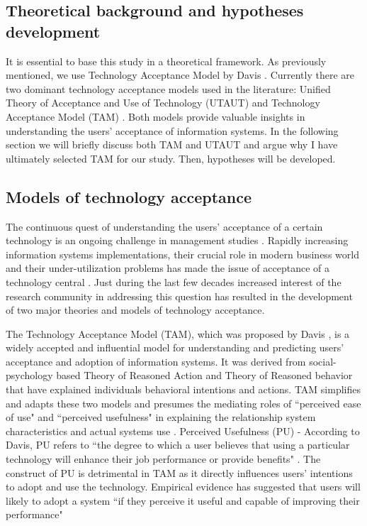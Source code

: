 \documentclass[a4paper,12pt]{article}
\newcommand{\citeyearonly}[1]{\citeyearpar{#1}}
\begin{document}
\subsection{Theoretical background and hypotheses development}

It is essential to base this study in a theoretical framework. As previously mentioned, we use Technology Acceptance Model by Davis \citeyearonly{davis1985technology}. Currently there are two dominant technology acceptance models used in the literature: Unified Theory of Acceptance and Use of Technology (UTAUT) and Technology Acceptance Model (TAM) \citep{venkatesh2003utaut, davis1985technology}. Both models provide valuable insights in understanding the users' acceptance of information systems. In the following section we will briefly discuss both TAM and UTAUT and argue why I have ultimately selected TAM for our study. Then, hypotheses will be developed.

\subsection{Models of technology acceptance}

The continuous quest of understanding the users' acceptance of a certain technology is an ongoing challenge in management studies \citep{schwarz2007looking, williams2009contemporary}.  Rapidly increasing information systems implementations, their crucial role in modern business world and their under-utilization problems has made the issue of acceptance of a technology central \citep{lancelotmiltgenDeterminantsEnduserAcceptance2013}. Just during the last few decades increased interest of the research community in addressing this question has resulted in the development of two major theories and models of technology acceptance. 

The Technology Acceptance Model (TAM), which was proposed by Davis \citeyearonly{davis1985technology}, is a widely accepted and influential model for understanding and predicting users' acceptance and adoption of information systems. It was derived from social-psychology based Theory of Reasoned Action and Theory of Reasoned behavior that have explained individuals behavioral intentions and actions. TAM simplifies and adapts these two models and presumes the mediating roles of ``perceived ease of use" and ``perceived usefulness" in explaining the relationship system characteristics and actual systems use \citep{marangunic2015technology}. 
Perceived Usefulness (PU) - According to Davis, PU refers to ``the degree to which a user believes that using a particular technology will enhance their job performance or provide benefits" \citep{davis1985technology}. The construct of PU is detrimental in TAM as it directly influences users' intentions to adopt and use the technology. Empirical evidence has suggested that users will likely to adopt a system ``if they perceive it useful and capable of improving their performance" \citep{davis1985technology}
\end{document}

